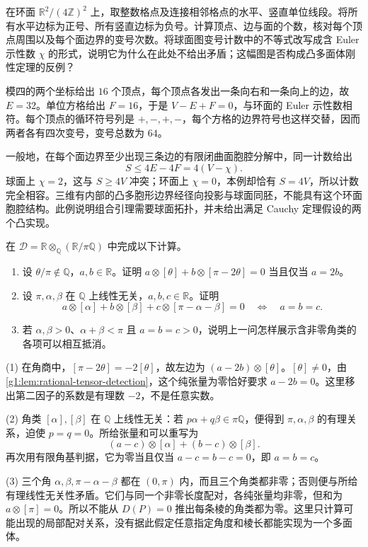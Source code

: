 \begin{exercise}\label{g1:ex:E04:torus-signs}
	在环面 \(\mathbb R^2/(4\mathbb Z)^2\) 上，取整数格点及连接相邻格点的水平、竖直单位线段。将所有水平边标为正号、所有竖直边标为负号。计算顶点、边与面的个数，核对每个顶点周围以及每个面边界的变号次数。将球面图变号计数中的不等式改写成含 Euler 示性数 \(\chi\) 的形式，说明它为什么在此处不给出矛盾；这幅图是否构成凸多面体刚性定理的反例？
\end{exercise}
\begin{solution}
	模四的两个坐标给出 \(16\) 个顶点，每个顶点各发出一条向右和一条向上的边，故 \(E=32\)。单位方格给出 \(F=16\)，于是 \(V-E+F=0\)，与环面的 Euler 示性数相符。每个顶点的循环符号列是 \(+,-,+,-\)，每个方格的边界符号也这样交替，因而两者各有四次变号，变号总数为 \(64\)。

	一般地，在每个面边界至少出现三条边的有限闭曲面胞腔分解中，同一计数给出
	\[
		S\le4E-4F=4(V-\chi).
	\]
	球面上 \(\chi=2\)，这与 \(S\ge4V\) 冲突；环面上 \(\chi=0\)，本例却恰有 \(S=4V\)，所以计数完全相容。三维有内部的凸多胞形边界经径向投影与球面同胚，不能具有这个环面胞腔结构。此例说明组合引理需要球面拓扑，并未给出满足 Cauchy 定理假设的两个凸实现。
\end{solution}

\begin{exercise}
	\label{g1:ex:dehn-angle-relations}
	在 \(\mathcal D=\mathbb R\otimes_{\mathbb Q}(\mathbb R/\pi\mathbb Q)\) 中完成以下计算。
	\begin{enumerate}
		\item 设 \(\theta/\pi\notin\mathbb Q\)，\(a,b\in\mathbb R\)。证明 \(a\otimes[\theta]+b\otimes[\pi-2\theta]=0\) 当且仅当 \(a=2b\)。
		\item 设 \(\pi,\alpha,\beta\) 在 \(\mathbb Q\) 上线性无关，\(a,b,c\in\mathbb R\)。证明
		\[
			a\otimes[\alpha]+b\otimes[\beta]
			+c\otimes[\pi-\alpha-\beta]=0
			\quad\Longleftrightarrow\quad a=b=c.
		\]
		\item 若 \(\alpha,\beta>0\)、\(\alpha+\beta<\pi\) 且 \(a=b=c>0\)，说明上一问怎样展示含非零角类的各项可以相互抵消。
	\end{enumerate}
\end{exercise}
\begin{solution}
	(1) 在角商中，\([\pi-2\theta]=-2[\theta]\)，故左边为 \((a-2b)\otimes[\theta]\)。\([\theta]\ne0\)，由\cref{g1:lem:rational-tensor-detection}，这个纯张量为零恰好要求 \(a-2b=0\)。这里移出第二因子的系数是有理数 \(-2\)，不是任意实数。

	(2) 角类 \([\alpha],[\beta]\) 在 \(\mathbb Q\) 上线性无关：若 \(p\alpha+q\beta\in\pi\mathbb Q\)，便得到 \(\pi,\alpha,\beta\) 的有理关系，迫使 \(p=q=0\)。所给张量和可以重写为
	\[
		(a-c)\otimes[\alpha]+(b-c)\otimes[\beta].
	\]
	再次用有限角基判据，它为零当且仅当 \(a-c=b-c=0\)，即 \(a=b=c\)。

	(3) 三个角 \(\alpha,\beta,\pi-\alpha-\beta\) 都在 \((0,\pi)\) 内，而且三个角类都非零；否则便与所给有理线性无关性矛盾。它们与同一个非零长度配对，各纯张量均非零，但和为 \(a\otimes[\pi]=0\)。所以不能从 \(D(P)=0\) 推出每条棱的角类都为零。这里只计算可能出现的局部配对关系，没有据此假定任意指定角度和棱长都能实现为一个多面体。
\end{solution}

